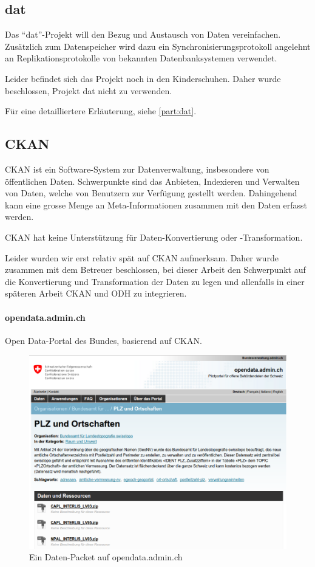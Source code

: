 \subsection{dat}
Das ``dat''-Projekt will den Bezug und Austausch von Daten vereinfachen. Zusätzlich zum Datenspeicher wird dazu ein Synchronisierungsprotokoll angelehnt an Replikationsprotokolle von bekannten Datenbanksystemen verwendet.

Leider befindet sich das Projekt noch in den Kinderschuhen. Daher wurde beschlossen, Projekt dat nicht zu verwenden.

Für eine detailliertere Erläuterung, siehe \cref{part:dat}.

\subsection{CKAN}
CKAN ist ein Software-System zur Datenverwaltung, insbesondere von öffentlichen Daten. Schwerpunkte sind das Anbieten, Indexieren und Verwalten von Daten, welche von Benutzern zur Verfügung gestellt werden. Dahingehend kann eine grosse Menge an Meta-Informationen zusammen mit den Daten erfasst werden. 

CKAN hat keine Unterstützung für Daten-Konvertierung oder -Transformation.

Leider wurden wir erst relativ spät auf CKAN aufmerksam. Daher wurde zusammen mit dem Betreuer beschlossen, bei dieser Arbeit den Schwerpunkt auf die Konvertierung und Transformation der Daten zu legen und allenfalls in einer späteren Arbeit CKAN und ODH zu integrieren.

\paragraph{opendata.admin.ch}
Open Data-Portal des Bundes, basierend auf CKAN.

\begin{figure}[H]
    \centering
    \includegraphics[width=2\linewidth/3]{fig/opendata-admin-ch}
    \caption{Ein Daten-Packet auf opendata.admin.ch}
\end{figure}


